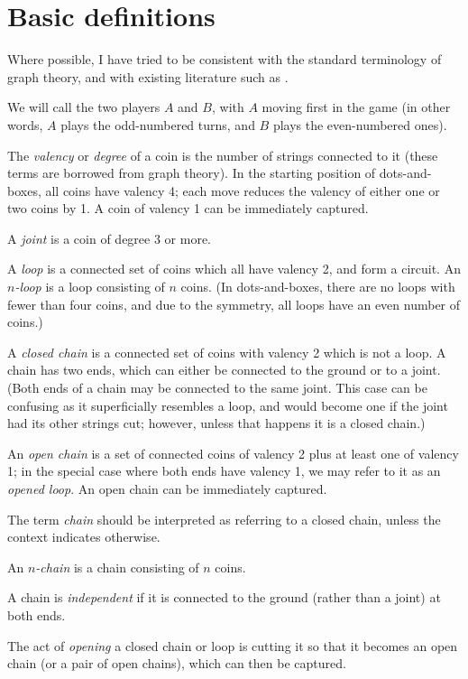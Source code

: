 \documentclass[a4paper,twocolumn]{article}
\begin{document}
\section{Basic definitions}

Where possible, I have tried to be consistent with the standard
terminology of graph theory, and with existing literature such as
\cite{berl}.

We will call the two players $A$ and $B$, with $A$ moving first in the
game (in other words, $A$ plays the odd-numbered turns, and $B$ plays
the even-numbered ones).

The \emph{valency} or \emph{degree} of a coin is the number of strings
connected to it (these terms are borrowed from graph theory). In the
starting position of dots-and-boxes, all coins have valency 4; each
move reduces the valency of either one or two coins by 1. A coin of
valency 1 can be immediately captured.

A \emph{joint} is a coin of degree 3 or more.

A \emph{loop} is a connected set of coins which all have valency 2,
and form a circuit. An \emph{$n$-loop} is a loop consisting of $n$
coins. (In dots-and-boxes, there are no loops with fewer than four
coins, and due to the symmetry, all loops have an even number of
coins.)

A \emph{closed chain} is a connected set of coins with valency 2 which
is not a loop. A chain has two ends, which can either be connected to
the ground or to a joint. (Both ends of a chain may be connected to
the same joint. This case can be confusing as it superficially
resembles a loop, and would become one if the joint had its other
strings cut; however, unless that happens it is a closed chain.)

An \emph{open chain} is a set of connected coins of valency 2 plus at
least one of valency 1; in the special case where both ends have
valency 1, we may refer to it as an \emph{opened loop}. An open chain
can be immediately captured.

The term \emph{chain} should be interpreted as referring to a closed
chain, unless the context indicates otherwise.

An \emph{$n$-chain} is a chain consisting of $n$ coins.

A chain is \emph{independent} if it is connected to the ground (rather
than a joint) at both ends.

The act of \emph{opening} a closed chain or loop is cutting it so that
it becomes an open chain (or a pair of open chains), which can then be
captured.
\end{document}
